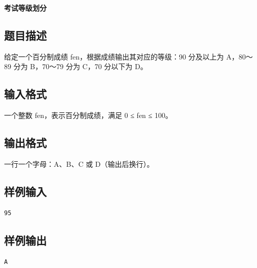\documentclass{article}
\newcommand{\problemname}[1]{\begin{center}\Large\bfseries #1\end{center}}
\begin{document}
\problemname{考试等级划分}

\subsection*{题目描述}
给定一个百分制成绩 fen，根据成绩输出其对应的等级：90 分及以上为 A，80～89 分为 B，70～79 分为 C，70 分以下为 D。

\subsection*{输入格式}
一个整数 fen，表示百分制成绩，满足 0 ≤ fen ≤ 100。

\subsection*{输出格式}
一行一个字母：A、B、C 或 D（输出后换行）。

\subsection*{样例输入}
\begin{verbatim}
95
\end{verbatim}

\subsection*{样例输出}
\begin{verbatim}
A
\end{verbatim}
\end{document}
